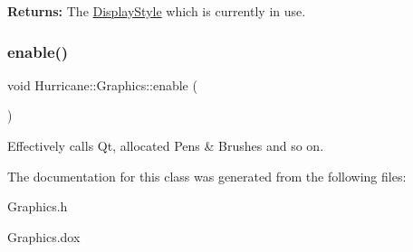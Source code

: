 {\bfseries Returns\+:} The \mbox{\hyperlink{classHurricane_1_1DisplayStyle}{Display\+Style}} which is currently in use. \mbox{\label{classHurricane_1_1Graphics_a08e5240382c4bc97fd84b6fa0e7d8b8e}} 
\subsubsection{\texorpdfstring{enable()}{enable()}}
{\footnotesize\ttfamily void Hurricane\+::\+Graphics\+::enable (\begin{DoxyParamCaption}{ }\end{DoxyParamCaption})\hspace{0.3cm}{\ttfamily [static]}}

Effectively calls Qt, allocated Pens \& Brushes and so on. 

The documentation for this class was generated from the following files\+:\begin{DoxyCompactItemize}
\item 
Graphics.\+h\item 
Graphics.\+dox\end{DoxyCompactItemize}
